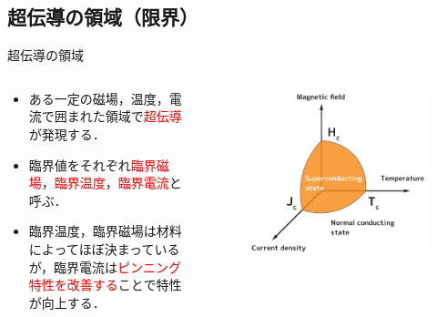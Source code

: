 \documentclass[aspectratio=169, unicode, 10pt]{beamer}
\begin{document}
	\subsection{超伝導の領域（限界）}
	\begin{frame}{超伝導の領域}
		\begin{columns}
			\begin{column}{0.6\linewidth}
				\begin{block}{}
					\begin{itemize}
						\item ある一定の磁場，温度，電流で囲まれた領域で\textcolor{red}{超伝導}が発現する．
						\item 臨界値をそれぞれ\textcolor{red}{臨界磁場}，\textcolor{red}{臨界温度}，\textcolor{red}{臨界電流}と呼ぶ．
						\item 臨界温度，臨界磁場は材料によってほぼ決まっているが，臨界電流は\textcolor{red}{ピンニング特性を改善する}ことで特性が向上する．
					\end{itemize}
				\end{block}
			\end{column}
			\begin{column}{0.4\linewidth}
				\begin{figure}
					\centering
					\includegraphics[width=\linewidth]{figs/SCstate.pdf}
				\end{figure}
			\end{column}
		\end{columns}
	\end{frame}
\end{document}
